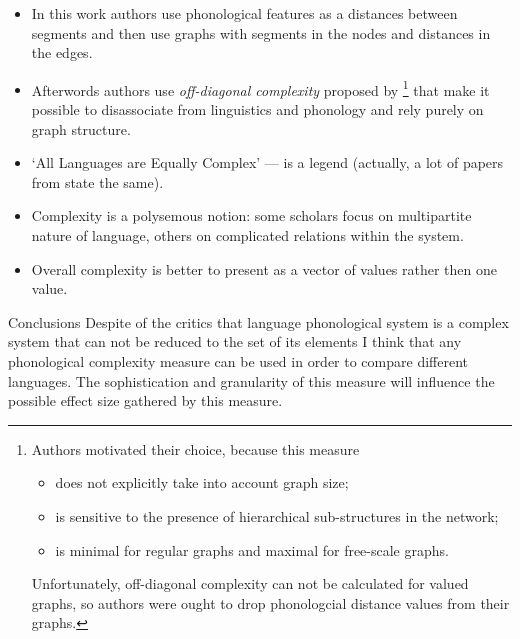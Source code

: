 \documentclass[
  ignorenonframetext,
]{beamer}
\providecommand{\tightlist}{%
  \setlength{\itemsep}{0pt}\setlength{\parskip}{0pt}}
\begin{document}
\begin{frame}{\citep{coupe09}}
\protect\hypertarget{coupe09-1}{}
\begin{itemize}
\tightlist
\item
  In this work authors use phonological features as a distances between
  segments and then use graphs with segments in the nodes and distances
  in the edges.
\item
  Afterwords authors use \emph{off-diagonal complexity} proposed by
  \citep{claussen07}\footnote[frame]{Authors motivated their choice, because this measure
  \begin{itemize}
  \item does not explicitly take into account graph size;
  \item is sensitive to the presence of hierarchical sub-structures in the network;
  \item is minimal for regular graphs and maximal for free-scale graphs.
  \end{itemize}
  Unfortunately, off-diagonal complexity can not be calculated for valued graphs, so authors were ought to drop phonologcial distance values from their graphs.
  } that make it possible to disassociate from linguistics and phonology
  and rely purely on graph structure.
\end{itemize}

\setcounter{footnote}{0}
\end{frame}

\begin{frame}{\citep{deutscher09}}
\protect\hypertarget{deutscher09}{}
\begin{itemize}
\tightlist
\item
  `All Languages are Equally Complex' --- is a legend (actually, a lot
  of papers from \citep{sampson09} state the same).
\item
  Complexity is a polysemous notion: some scholars focus on multipartite
  nature of language, others on complicated relations within the system.
\item
  Overall complexity is better to present as a vector of values rather
  then one value.
\end{itemize}
\end{frame}

\begin{frame}{Conclusions}
\protect\hypertarget{conclusions}{}
Despite of the critics that language phonological system is a complex
system that can not be reduced to the set of its elements
\citep{simpson99, ohala09, coupe09, deutscher09} I think that any
phonological complexity measure can be used in order to compare
different languages. The sophistication and granularity of this measure
will influence the possible effect size gathered by this measure.
\end{frame}
\end{document}
